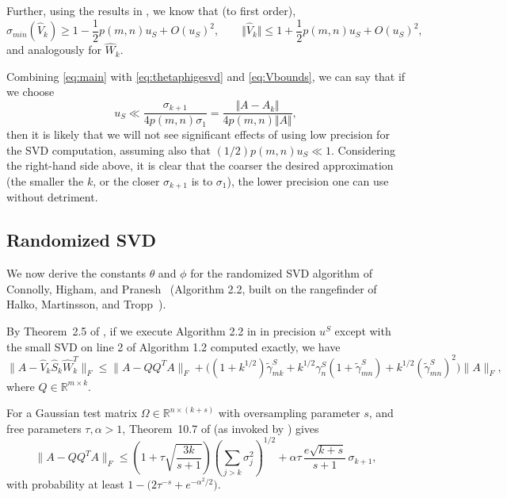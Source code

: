 \documentclass[12pt, a4paper]{article}
\newcommand{\What}{\widehat{W}}
\newcommand{\Shat}{\widehat{S}}
\newcommand{\Vhat}{\widehat{V}}
\theoremstyle{remark}
\begin{document}
Further, using the results in \cite{anderson1999lapack}, we know that (to first order),
\begin{equation}
\sigma_{min}(\Vhat_k) \geq 1 - \frac{1}{2}p(m,n)u_S+O(u_S)^2, \qquad \Vert \Vhat_k\Vert \leq 1 + \frac{1}{2}p(m,n)u_S+O(u_S)^2,
\label{eq:Vbounds}
\end{equation}
and analogously for $\What_k$.

Combining \eqref{eq:main} with \eqref{eq:thetaphigesvd} and \eqref{eq:Vbounds}, we can say that if we choose
\begin{equation}
u_S \ll \frac{\sigma_{k+1}}{4p(m,n)\sigma_1} = \frac{\Vert A-A_k\Vert}{4p(m,n)\Vert A\Vert},
\label{eq:usvdcond1}
\end{equation}
then it is likely that we will not see significant effects of using low precision for the SVD computation, assuming also that $(1/2)p(m,n)u_S\ll 1$. Considering the right-hand side above, it is clear that the coarser the desired approximation (the smaller the $k$, or the closer $\sigma_{k+1}$ is to $\sigma_1$), the lower precision one can use without detriment. 


\subsection{Randomized SVD}

\hspace{5mm}We now derive the constants $\theta$ and $\phi$ for the randomized SVD algorithm of
Connolly, Higham, and Pranesh~\cite{connolly2022randomized} (Algorithm 2.2, built on the rangefinder
of Halko, Martinsson, and Tropp~\cite{halko2011finding}). 


By Theorem~2.5 of \cite{connolly2022randomized}, if we execute Algorithm 2.2 in \cite{connolly2022randomized} in precision $u^S$ except with the small SVD on line 2 of Algorithm 1.2 computed exactly, we have
\begin{equation}
\|A-\Vhat_k \Shat_k \What_k^{T}\|_F
\le \|A-QQ^{T}A\|_F
+\Big((1+k^{1/2})\widetilde{\gamma}^S_{mk}+k^{1/2}\gamma^S_n(1+\widetilde{\gamma}^S_{mn})+k^{1/2}(\widetilde{\gamma}^S_{mn})^2\Big)\|A\|_F, 
\label{eq:errrsvd}
\end{equation}
where $Q\in\mathbb{R}^{m\times k}$.


For a Gaussian test matrix $\Omega \in \mathbb{R}^{n \times (k+s)}$ with oversampling
parameter $s$, and free parameters $\tau, \alpha>1$, Theorem~10.7 of \cite{halko2011finding}
(as invoked by \cite{connolly2022randomized}) gives
\begin{equation}
\|A-QQ^{T}A\|_F
\le \left(1+\tau\sqrt{\frac{3k}{s+1}}\right)\left(\sum_{j>k}\sigma_j^2\right)^{1/2}
+ \alpha\tau\, \frac{e\sqrt{k+s}}{s+1}\,\sigma_{k+1}, 
\label{eq:AQQTA}
\end{equation}
with probability at least $1-\big(2\tau^{-s}+e^{-\alpha^2/2}\big)$.
\end{document}

